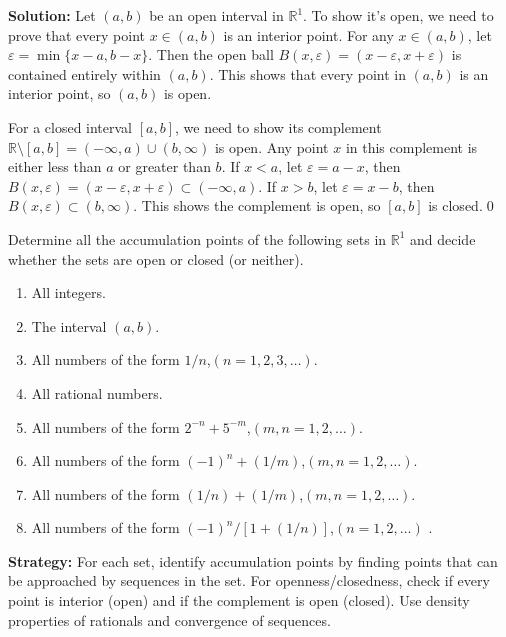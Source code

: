 \bigskip\noindent\textbf{Solution:} Let $(a,b)$ be an open interval in $\mathbb{R}^1$. To show it's open, we need to prove that every point $x \in (a,b)$ is an interior point. For any $x \in (a,b)$, let $\varepsilon = \min\{x-a, b-x\}$. Then the open ball $B(x,\varepsilon) = (x-\varepsilon, x+\varepsilon)$ is contained entirely within $(a,b)$. This shows that every point in $(a,b)$ is an interior point, so $(a,b)$ is open.

For a closed interval $[a,b]$, we need to show its complement $\mathbb{R} \setminus [a,b] = (-\infty,a) \cup (b,\infty)$ is open. Any point $x$ in this complement is either less than $a$ or greater than $b$. If $x < a$, let $\varepsilon = a-x$, then $B(x,\varepsilon) = (x-\varepsilon, x+\varepsilon) \subset (-\infty,a)$. If $x > b$, let $\varepsilon = x-b$, then $B(x,\varepsilon) \subset (b,\infty)$. This shows the complement is open, so $[a,b]$ is closed.\qed


\begin{problembox}
\begin{problemstatement}
Determine all the accumulation points of the following sets in $\mathbb{R}^1$ and decide whether the sets are open or closed (or neither).
\begin{enumerate}[label=\textbf{(\alph*)}]
\item All integers.
\item The interval $(a, b)$.
\item All numbers of the form $1/n$,\quad $(n = 1, 2, 3, \dots)$.
\item All rational numbers.
\item All numbers of the form $2^{-n} + 5^{-m}$,\quad $(m, n = 1, 2, \dots)$.
\item All numbers of the form $(-1)^n + (1/m)$,\quad $(m, n = 1, 2, \dots)$.
\item All numbers of the form $(1/n) + (1/m)$,\quad $(m, n = 1, 2, \dots)$.
\item All numbers of the form $(-1)^n / [1 + (1/n)]$,\quad $(n = 1, 2, \dots)$
.
\end{enumerate}
\end{problemstatement}
\end{problembox}

\noindent\textbf{Strategy:} For each set, identify accumulation points by finding points that can be approached by sequences in the set. For openness/closedness, check if every point is interior (open) and if the complement is open (closed). Use density properties of rationals and convergence of sequences.

